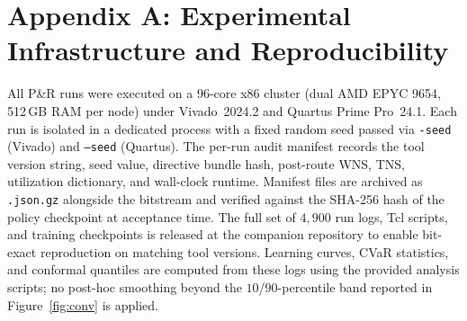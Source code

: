 \documentclass[journal]{IEEEtran}
\begin{document}
\section*{Appendix A: Experimental Infrastructure and Reproducibility}
All P\&R runs were executed on a 96-core x86 cluster (dual AMD EPYC 9654, 512\,GB RAM per node) under Vivado~2024.2 and Quartus Prime Pro~24.1. Each run is isolated in a dedicated process with a fixed random seed passed via \texttt{-seed} (Vivado) and \texttt{--seed} (Quartus). The per-run audit manifest records the tool version string, seed value, directive bundle hash, post-route WNS, TNS, utilization dictionary, and wall-clock runtime. Manifest files are archived as \texttt{.json.gz} alongside the bitstream and verified against the SHA-256 hash of the policy checkpoint at acceptance time. The full set of $4{,}900$ run logs, Tcl scripts, and training checkpoints is released at the companion repository to enable bit-exact reproduction on matching tool versions. Learning curves, CVaR statistics, and conformal quantiles are computed from these logs using the provided analysis scripts; no post-hoc smoothing beyond the $10$/$90$-percentile band reported in Figure~\ref{fig:conv} is applied.
\end{document}
